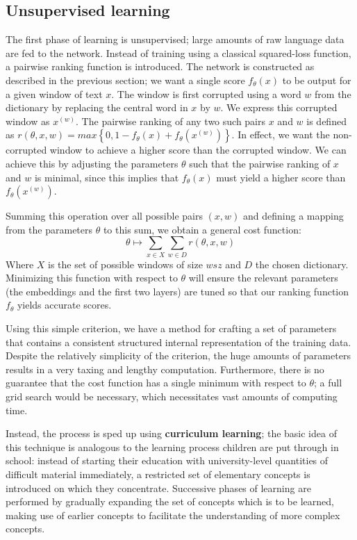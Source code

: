 \subsection{Unsupervised learning}
\label{sec:unsupervised}

The first phase of learning is unsupervised; large amounts of raw
language data are fed to the network. Instead of training using a
classical squared-loss function, a pairwise ranking function is
introduced. The network is constructed as described in the previous
section; we want a single score $f_{\theta}(x)$ to be output for a
given window of text $x$.  The window is first corrupted using a word
$w$ from the dictionary by replacing the central word in $x$ by
$w$. We express this corrupted window as $x^{(w)}$. The pairwise
ranking of any two such pairs $x$ and $w$ is defined as $r(\theta, x, w) = max\left\{0,
  1 - f_{\theta}(x) + f_{\theta}(x^{(w)})\right\}$. 
In effect, we want the non-corrupted window to achieve a higher score
than the corrupted window. We can achieve this by adjusting the
parameters $\theta$ such that the pairwise ranking of $x$ and $w$ is
minimal, since this implies that $f_{\theta}(x)$ must yield a higher
score than $f_{\theta}(x^{(w)})$.

Summing this operation over all possible pairs $(x, w)$ and defining a
mapping from the parameters $\theta$ to this sum, we obtain a general
cost function:
\begin{equation}
  \theta \mapsto \sum\limits_{x \in X} \sum\limits_{w \in D} r(\theta, x, w)
\end{equation}
Where $X$ is the set of possible windows of size $wsz$ and $D$ the chosen
dictionary. Minimizing this function with respect to $\theta$ will
ensure the relevant parameters (the embeddings and the first two
layers) are tuned so that our ranking function $f_{\theta}$ yields
accurate scores. 

Using this simple criterion, we have a method for crafting a set of
parameters that contains a consistent structured internal
representation of the training data. Despite the relatively simplicity
of the criterion, the huge amounts of parameters results in a very
taxing and lengthy computation. Furthermore, there is no guarantee
that the cost function has a single minimum with respect to $\theta$;
a full grid search would be necessary, which necessitates vast amounts
of computing time.

Instead, the process is sped up using \textbf{curriculum learning};
the basic idea of this technique is analogous to the learning process
children are put through in school: instead of starting their
education with university-level quantities of difficult material
immediately, a restricted set of elementary concepts is introduced on
which they concentrate. Successive phases of learning are performed by
gradually expanding the set of concepts which is to be learned, making
use of earlier concepts to facilitate the understanding of more
complex concepts.

